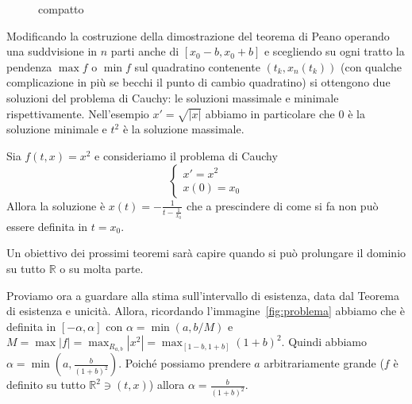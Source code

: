 \begin{figure}[ht]
    \centering
    \caption{compatto}
    \label{fig:compatto}
\end{figure}
\begin{remark}
    Modificando la costruzione della dimostrazione del teorema di Peano
    operando una suddvisione in \(n\) parti anche di \([x_{0}-b, x_{0}+b]\) e
    scegliendo su ogni tratto la pendenza \(\max f\) o \(\min f\) sul quadratino
    contenente \((t_{k}, x_{n}(t_k))\) (con qualche complicazione in più se
    becchi il punto di cambio quadratino) si ottengono due soluzioni del
    problema di Cauchy: le soluzioni massimale e minimale rispettivamente.
    Nell'esempio \(x' = \sqrt{|x|}\) abbiamo in particolare che \(0\) è la
    soluzione minimale e \(t^2\) è la soluzione massimale.
\end{remark}
\begin{example}
    Sia \(f(t, x) = x^2\) e consideriamo il problema di Cauchy
    \[
        \begin{cases}
            x' = x^2 \\
            x(0) = x_{0}
        \end{cases}
    \]
    Allora la soluzione è \(x(t) = -\frac{1}{t-\frac{1}{x_{0}}}\) che a
    prescindere di come si fa non può essere definita in \(t = x_{0}\).
    \begin{figure}[ht]
        \centering
    \end{figure}
    Un obiettivo dei prossimi teoremi sarà capire quando si può prolungare il
    dominio su tutto \(\mathbb{R}\) o su molta parte.
\end{example}

Proviamo ora a guardare alla stima sull'intervallo di esistenza, data dal
Teorema di esistenza e unicità. Allora, ricordando
l'immagine~\ref{fig:problema} %
abbiamo che è definita in \([-\alpha, \alpha]\) con \(\alpha = \min(a, b/M)\) e
\(M = \max |f| = \max_{R_{a,b} }  |x^2| = \max_{[1-b, 1+b]}{(1+b)}^2\).
Quindi abbiamo \(\alpha = \min(a, \frac{b}{{(1+b)}^2})\). Poiché possiamo
prendere \(a\) arbitrariamente grande (\(f\) è definito su tutto \(\mathbb{R}^2
\ni (t, x)\)) allora \(\alpha = \frac{b}{{(1+b)}^2}\).

